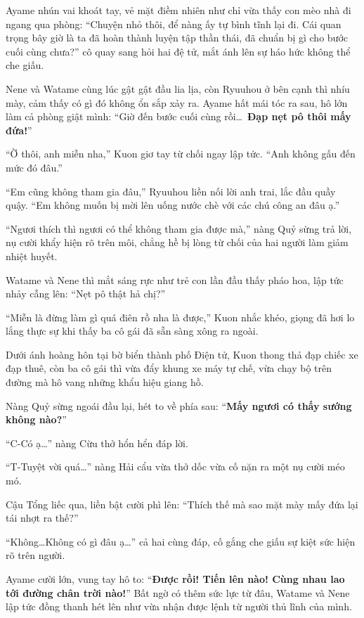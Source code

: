\documentclass[../main.tex]{subfiles}
\begin{document}
Ayame nhún vai khoát tay, vẻ mặt điềm nhiên như chỉ vừa thấy con mèo nhà đi ngang qua phòng: ``Chuyện nhỏ thôi, để nàng ấy tự bình tĩnh lại đi. Cái quan trọng bây giờ là ta đã hoàn thành luyện tập thần thái, đã chuẩn bị gì cho bước cuối cùng chưa?'' cô quay sang hỏi hai đệ tử, mắt ánh lên sự háo hức không thể che giấu.

Nene và Watame cùng lúc gật gật đầu lia lịa, còn Ryuuhou ở bên cạnh thì nhíu mày, cảm thấy có gì đó không ổn sắp xảy ra. Ayame hất mái tóc ra sau, hô lớn làm cả phòng giật mình: ``Giờ đến bước cuối cùng rồi\dots\ \textbf{Đạp nẹt pô thôi mấy đứa!}''

``Ờ thôi, anh miễn nha,'' Kuon giơ tay từ chối ngay lập tức. ``Anh không gấu đến mức đó đâu.''

``Em cũng không tham gia đâu,'' Ryuuhou liền nối lời anh trai, lắc đầu quầy quậy. ``Em không muốn bị mời lên uống nước chè với các chú công an đâu ạ.''

``Ngươi thích thì ngươi có thể không tham gia được mà,'' nàng Quỷ sừng trả lời, nụ cười khẩy hiện rõ trên môi, chẳng hề bị lòng từ chối của hai người làm giảm nhiệt huyết.

Watame và Nene thì mắt sáng rực như trẻ con lần đầu thấy pháo hoa, lập tức nhảy cẫng lên: ``Nẹt pô thật hả chị?''

``Miễn là đừng làm gì quá điên rồ nha là được,'' Kuon nhắc khéo, giọng đã hơi lo lắng thực sự khi thấy ba cô gái đã sẵn sàng xông ra ngoài.

\ct

Dưới ánh hoàng hôn tại bờ biển thành phố Điện tử, Kuon thong thả đạp chiếc xe đạp thuê, còn ba cô gái thì vừa đẩy khung xe máy tự chế, vừa chạy bộ trên đường mà hô vang những khẩu hiệu giang hồ.


Nàng Quỷ sừng ngoái đầu lại, hét to về phía sau: ``\textbf{Mấy ngươi có thấy sướng không nào?}''

``C-Có ạ\dots'' nàng Cừu thở hổn hển đáp lời.

``T-Tuyệt vời quá\dots'' nàng Hải cẩu vừa thở dốc vừa cố nặn ra một nụ cười méo mó.

Cậu Tổng liếc qua, liền bật cười phì lên: ``Thích thế mà sao mặt mày mấy đứa lại tái nhợt ra thế?''

``Không\dots Không có gì đâu ạ\dots'' cả hai cùng đáp, cố gắng che giấu sự kiệt sức hiện rõ trên người.

Ayame cười lớn, vung tay hô to: ``\textbf{Được rồi! Tiến lên nào! Cùng nhau lao tới đường chân trời nào!}'' Bất ngờ có thêm sức lực từ đâu, Watame và Nene lập tức đồng thanh hét lên như vừa nhận được lệnh từ người thủ lĩnh của mình.
\end{document}
